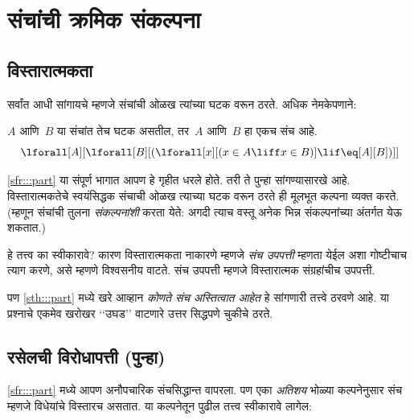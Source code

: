 \chapter{संचांची क्रमिक संकल्पना}\label{sth:story:chap}




\section{विस्तारात्मकता}\label{sth:story:extensionality:sec}

सर्वांत आधी सांगायचे म्हणजे
संचांची ओळख त्यांच्या
घटक वरून ठरते.
अधिक नेमकेपणाने:

\begin{axiom}[विस्तारात्मकता]
$A$ आणि~$B$ या संचांत
तेच घटक
असतील, तर~$A$
आणि~$B$ हा
एकच संच आहे.
\[
  \lforall[A][\lforall[B][(\lforall[x][(x \in A \liff x \in B)] \lif
  \eq[A][B])]]
\]
\end{axiom}

\ref{sfr:::part}
या संपूर्ण भागात
आपण हे गृहीत धरले
होते. तरी ते
पुन्हा सांगण्यासारखे
आहे. विस्तारात्मकतेचे
स्वयंसिद्धक संचाची
ओळख त्याच्या
घटक वरून
ठरते ही मूलभूत
कल्पना व्यक्त
करते. (म्हणून
संचांची तुलना
\emph{संकल्पनांशी}
करता येते:
अगदी त्याच
वस्तू अनेक
भिन्न संकल्पनांच्या
अंतर्गत येऊ
शकतात.)

हे तत्त्व का
स्वीकारावे? कारण
विस्तारात्मकता
नाकारणे म्हणजे
\emph{संच उपपत्ती}
म्हणता येईल
अशा गोष्टीचाच
त्याग करणे,
असे म्हणणे
विश्वसनीय वाटते.
संच उपपत्ती
म्हणजे विस्तारात्मक
संग्रहांचीच
उपपत्ती.

पण \ref{sth:::part}
मध्ये खरे आव्हान
\emph{कोणते संच
अस्तित्वात आहेत}
हे सांगणारी
तत्त्वे ठरवणे
आहे. या प्रश्नाचे
एकमेव खरोखर
‘‘उघड’’ वाटणारे
उत्तर सिद्धपणे
चुकीचे ठरते.







\section{रसेलची विरोधापत्ती (पुन्हा)}\label{sth:story:rus:sec}

\ref{sfr:::part}
मध्ये आपण अनौपचारिक
संचसिद्धान्त वापरला.
पण एका \emph{अतिशय}
भोळ्या कल्पनेनुसार
संच म्हणजे विधेयांचे
विस्तारच असतात.
या कल्पनेतून पुढील
तत्त्व स्वीकारावे लागेल:

